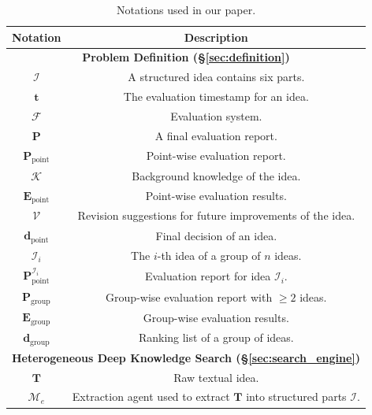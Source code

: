 \newcommand{\GG}{\cellcolor{mygrey}}

\begin{table}[htbp]
  \centering
  \renewcommand\arraystretch{1.}
  \small
  \caption{Notations used in our paper.}
  \vskip -0.1in
  \begin{tabular}{cc}
    \toprule
    \textbf{Notation} & \textbf{Description} \\
    \midrule
    \multicolumn{2}{c}{\GG \textbf{{Problem Definition (\S\ref{sec:definition})}}} \\
    \midrule
    $\boldsymbol{\mathcal{I}}$ & A structured idea contains six parts. \\
    $\boldsymbol{t}$ & The evaluation timestamp for an idea. \\
    $\boldsymbol{\mathcal{F}}$ & Evaluation system. \\
    $\boldsymbol{P}$ & A final evaluation report. \\
    $\boldsymbol{P}_\textrm{point}$ & Point-wise evaluation report. \\
    $\boldsymbol{\mathcal{K}}$ & Background knowledge of the idea. \\
    $\boldsymbol{E}_\textrm{point}$ & Point-wise evaluation results. \\
    $\boldsymbol{\mathcal{V}}$ & Revision suggestions for future improvements of the idea. \\
    $\boldsymbol{d}_\textrm{point}$ & Final decision of an idea. \\
    $\boldsymbol{\mathcal{I}}_i$ & The $i$-th idea of a group of $n$ ideas. \\
    $\boldsymbol{P}^{\mathcal{I}_i}_{\textrm{point}}$ & Evaluation report for idea $\boldsymbol{\mathcal{I}}_i$. \\
    $\boldsymbol{P}_\textrm{group}$ & Group-wise evaluation report with $\geq 2$ ideas. \\
    $\boldsymbol{E}_\textrm{group}$ & Group-wise evaluation results. \\
    $\boldsymbol{d}_\textrm{group}$ & Ranking list of a group of ideas. \\
    \midrule
    \multicolumn{2}{c}{\GG \textbf{{Heterogeneous Deep Knowledge Search (\S\ref{sec:search_engine})}}} \\
    \midrule
    $\boldsymbol{T}$ & Raw textual idea. \\
    $\boldsymbol{\mathcal{M}}_e$ & Extraction agent used to extract $\boldsymbol{T}$ into structured parts $\boldsymbol{\mathcal{I}}$. \\

\end{tabular}
\end{table}
